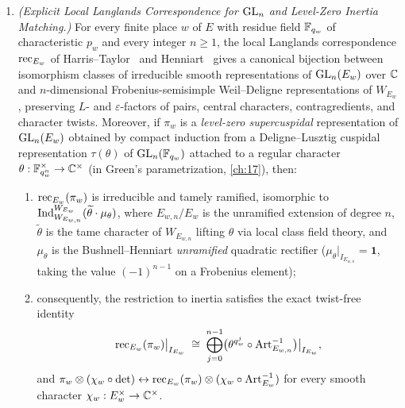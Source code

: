 \begin{theorem}
\begin{enumerate}[label=\textup{(\Alph*)}]
\item \emph{(Explicit Local Langlands Correspondence for $\mathrm{GL}_n$ and Level-Zero Inertia Matching.)}
For every finite place $w$ of $E$ with residue field $\mathbb{F}_{q_w}$ of characteristic $p_w$ and every integer $n \ge 1$, the local Langlands correspondence $\mathrm{rec}_{E_w}$ of Harris--Taylor~\cite{HarrisTaylor2001} and Henniart~\cite{Henniart2000} gives a canonical bijection between isomorphism classes of irreducible smooth representations of $\mathrm{GL}_n(E_w)$ over $\mathbb{C}$ and $n$-dimensional Frobenius-semisimple Weil--Deligne representations of $W_{E_w}$, preserving $L$- and $\varepsilon$-factors of pairs, central characters, contragredients, and character twists. Moreover, if $\pi_w$ is a \emph{level-zero supercuspidal} representation of $\mathrm{GL}_n(E_w)$ obtained by compact induction from a Deligne--Lusztig cuspidal representation $\tau(\theta)$ of $\mathrm{GL}_n(\mathbb{F}_{q_w})$ attached to a regular character $\theta : \mathbb{F}_{q_w^n}^\times \to \mathbb{C}^\times$ (in Green's parametrization, \cref{ch:17}), then:
\begin{enumerate}[label=\textup{(B\arabic*)}]
\item $\mathrm{rec}_{E_w}(\pi_w)$ is irreducible and tamely ramified, isomorphic to $\mathrm{Ind}_{W_{E_{w,n}}}^{W_{E_w}}(\widetilde{\theta} \cdot \mu_\theta)$, where $E_{w,n}/E_w$ is the unramified extension of degree $n$, $\widetilde{\theta}$ is the tame character of $W_{E_{w,n}}$ lifting $\theta$ via local class field theory, and $\mu_\theta$ is the Bushnell--Henniart \emph{unramified} quadratic rectifier ($\mu_\theta|_{I_{E_{w,n}}} = \mathbf{1}$, taking the value $(-1)^{n-1}$ on a Frobenius element);
\item consequently, the restriction to inertia satisfies the exact twist-free identity
  \begin{equation}
  \label{eq:01:level-zero-inertia}
    \mathrm{rec}_{E_w}(\pi_w)\big|_{I_{E_w}} \;\cong\; \bigoplus_{j = 0}^{n-1} \bigl(\theta^{q_w^j} \circ \mathrm{Art}_{E_{w,n}}^{-1}\bigr)\big|_{I_{E_w}},
  \end{equation}
  and $\pi_w \otimes (\chi_w \circ \det) \leftrightarrow \mathrm{rec}_{E_w}(\pi_w) \otimes (\chi_w \circ \mathrm{Art}_{E_w}^{-1})$ for every smooth character $\chi_w : E_w^\times \to \mathbb{C}^\times$.
\end{enumerate}
\end{enumerate}
\end{theorem}

